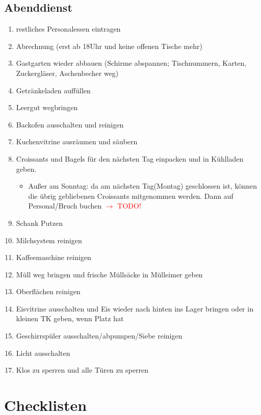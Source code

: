 \documentclass[12pt]{article}
\newcounter{row}
\begin{document}
\subsection{Abenddienst}
\begin{enumerate}
    \item restliches Personalessen eintragen
    \item Abrechnung (erst ab 18Uhr und keine offenen Tische mehr)
    \item Gastgarten wieder abbauen (Schirme abspannen; Tischnummern, Karten, Zuckergläser, Aschenbecher weg)
    \item Getränkeladen auffüllen
    \item Leergut wegbringen
    \item Backofen ausschalten und reinigen
    \item Kuchenvitrine ausräumen und säubern
    \item Croissants und Bagels für den nächsten Tag einpacken und in Kühlladen geben.
    \begin{itemize}
        \item[] Außer am Sonntag: da am nächsten Tag(Montag) geschlossen ist, können die übrig gebliebenen Croissants mitgenommen werden. Dann auf Personal/Bruch buchen \textcolor{red}{$\longrightarrow$ TODO!}
    \end{itemize}
    \item Schank Putzen
    \item Milchsystem reinigen
    \item Kaffeemaschine reinigen
    \item Müll weg bringen und frische Müllsäcke in Mülleimer geben
    \item Oberflächen reinigen
    \item Eisvitrine ausschalten und Eis wieder nach hinten ins Lager bringen oder in kleinen TK geben, wenn Platz hat
    \item Geschirrspüler ausschalten/abpumpen/Siebe reinigen
    \item Licht ausschalten
    \item Klos zu sperren und alle Türen zu sperren
\end{enumerate}


\clearpage
\section{Checklisten}
\end{document}
